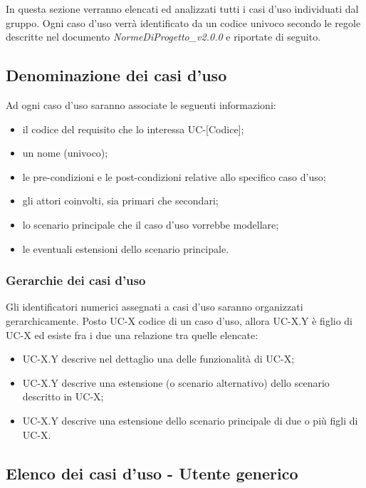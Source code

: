 In questa sezione verranno elencati ed analizzati tutti i casi d'uso individuati dal gruppo. Ogni caso d'uso verrà identificato da un codice univoco secondo le regole descritte nel documento \textit{NormeDiProgetto\_v2.0.0} e riportate di seguito. 

\subsection{Denominazione dei casi d'uso}
Ad ogni caso d'uso saranno associate le seguenti informazioni:
\begin{itemize}
\item il codice del requisito che lo interessa UC-[Codice];
\item un nome (univoco);
\item le pre-condizioni e le post-condizioni relative allo specifico caso d'uso;
\item gli attori coinvolti, sia primari che secondari;
\item lo scenario principale che il caso d'uso vorrebbe modellare;
\item le eventuali estensioni dello scenario principale.
\end{itemize}

\subsubsection{Gerarchie dei casi d'uso} 
Gli identificatori numerici assegnati a casi d'uso saranno organizzati gerarchicamente. Posto UC-X codice di un caso d'uso, allora UC-X.Y è figlio di UC-X ed esiste fra i due una relazione tra quelle elencate:
\begin{itemize}
\item UC-X.Y descrive nel dettaglio una delle funzionalità di UC-X;
\item UC-X.Y descrive una estensione (o scenario alternativo) dello scenario descritto in UC-X; 
\item UC-X.Y descrive una estensione dello scenario principale di due o più figli di UC-X.
\end{itemize}

\subsection{Elenco dei casi d'uso - Utente generico}

